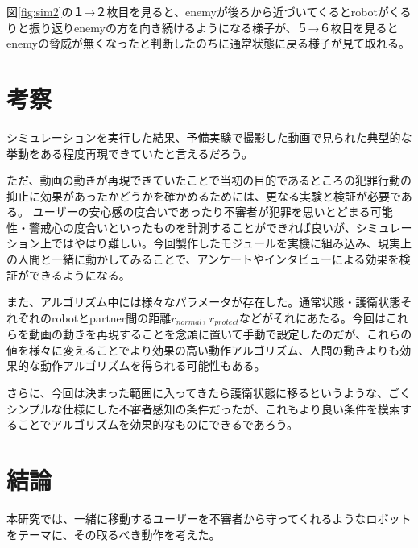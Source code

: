 \documentclass{kuisthesis}
\begin{document}
図\ref{fig:sim2}の１→２枚目を見ると、enemyが後ろから近づいてくるとrobotがくるりと振り返りenemyの方を向き続けるようになる様子が、５→６枚目を見るとenemyの脅威が無くなったと判断したのちに通常状態に戻る様子が見て取れる。







\section{考察}

シミュレーションを実行した結果、予備実験で撮影した動画で見られた典型的な挙動をある程度再現できていたと言えるだろう。

ただ、動画の動きが再現できていたことで当初の目的であるところの犯罪行動の抑止に効果があったかどうかを確かめるためには、更なる実験と検証が必要である。
ユーザーの安心感の度合いであったり不審者が犯罪を思いとどまる可能性・警戒心の度合いといったものを計測することができれば良いが、シミュレーション上ではやはり難しい。今回製作したモジュールを実機に組み込み、現実上の人間と一緒に動かしてみることで、アンケートやインタビューによる効果を検証ができるようになる。

また、アルゴリズム中には様々なパラメータが存在した。通常状態・護衛状態それぞれのrobotとpartner間の距離$r_{normal}$, $r_{protect}$などがそれにあたる。今回はこれらを動画の動きを再現することを念頭に置いて手動で設定したのだが、これらの値を様々に変えることでより効果の高い動作アルゴリズム、人間の動きよりも効果的な動作アルゴリズムを得られる可能性もある。

さらに、今回は決まった範囲に入ってきたら護衛状態に移るというような、ごくシンプルな仕様にした不審者感知の条件だったが、これもより良い条件を模索することでアルゴリズムを効果的なものにできるであろう。


\section{結論}
本研究では、一緒に移動するユーザーを不審者から守ってくれるようなロボットをテーマに、その取るべき動作を考えた。
\end{document}
